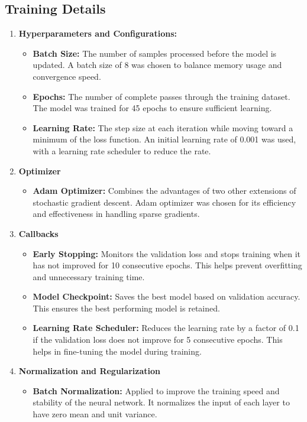 \subsection{Training Details}
\begin{enumerate}
    \item \textbf{Hyperparameters and Configurations:}
    \begin{itemize}
        \item \textbf{Batch Size: }The number of samples processed before the model is updated. A batch size of 8 was chosen to balance memory usage and convergence speed.
        \item \textbf{Epochs: }The number of complete passes through the training dataset. The model was trained for 45 epochs to ensure sufficient learning.
        \item \textbf{Learning Rate: }The step size at each iteration while moving toward a minimum of the loss function. An initial learning rate of 0.001 was used, with a learning rate scheduler to reduce the rate.
    \end{itemize}
    \item \textbf{Optimizer}
    \begin{itemize}
        \item \textbf{Adam Optimizer: }Combines the advantages of two other extensions of stochastic gradient descent. Adam optimizer was chosen for its efficiency and effectiveness in handling sparse gradients.
    \end{itemize}
    \item \textbf{Callbacks}
    \begin{itemize}
        \item \textbf{Early Stopping: }Monitors the validation loss and stops training when it has not improved for 10 consecutive epochs. This helps prevent overfitting and unnecessary training time.
        \item \textbf{Model Checkpoint: }Saves the best model based on validation accuracy. This ensures the best performing model is retained.
        \item \textbf{Learning Rate Scheduler: }Reduces the learning rate by a factor of 0.1 if the validation loss does not improve for 5 consecutive epochs. This helps in fine-tuning the model during training.
    \end{itemize}
    \item \textbf{Normalization and Regularization}
    \begin{itemize}
        \item \textbf{Batch Normalization: }Applied to improve the training speed and stability of the neural network. It normalizes the input of each layer to have zero mean and unit variance.
    
    \end{itemize}
\end{enumerate}

